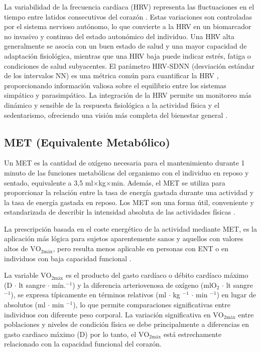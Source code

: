 La variabilidad de la frecuencia cardíaca (HRV) representa las fluctuaciones en el tiempo entre latidos consecutivos del corazón \citep{TaskForce1996,Quigley2024Publication}. Estas variaciones son controladas por el sistema nervioso autónomo, lo que convierte a la HRV en un biomarcador no invasivo y continuo del estado autonómico del individuo. Una HRV alta generalmente se asocia con un buen estado de salud y una mayor capacidad de adaptación fisiológica, mientras que una HRV baja puede indicar estrés, fatiga o condiciones de salud subyacentes. El parámetro HRV-SDNN (desviación estándar de los intervalos NN) es una métrica común para cuantificar la HRV \citep{Damoun2024HRV,Laborde2017}, proporcionando información valiosa sobre el equilibrio entre los sistemas simpático y parasimpático. La integración de la HRV permite un monitoreo más dinámico y sensible de la respuesta fisiológica a la actividad física y el sedentarismo, ofreciendo una visión más completa del bienestar general \citep{Bonneval2025Validity}.

\subsection{MET (Equivalente Metabólico)}
\label{subsec:met}

Un MET es la cantidad de oxígeno necesaria para el mantenimiento durante 1 minuto de las funciones metabólicas del organismo con el individuo en reposo y sentado, equivalente a 3,5 ml$\times$kg$\times$min. Además, el MET se utiliza para proporcionar la relación entre la tasa de energía gastada durante una actividad y la tasa de energía gastada en reposo. Los MET son una forma útil, conveniente y estandarizada de describir la intensidad absoluta de las actividades físicas \citep{Riebe2018ACSM}.

La prescripción basada en el coste energético de la actividad mediante MET, es la aplicación más lógica para sujetos aparentemente sanos y aquellos con valores altos de $\mathrm{VO}_{2\text{máx}}$, pero resulta menos aplicable en personas con ENT o en individuos con baja capacidad funcional \citep{Abellan2014Prescripcion}.

La variable $\mathrm{VO}_{2\text{máx}}$ es el producto del gasto cardíaco o débito cardíaco máximo (D $\cdot$ lt sangre $\cdot$ mín.$^{-1}$) y la diferencia arteriovenosa de oxígeno (mlO$_2$ $\cdot$ lt sangre $^{-1}$), se expresa típicamente en términos relativos (ml $\cdot$ kg $^{-1}$ $\cdot$ min $^{-1}$) en lugar de absolutos (ml $\cdot$ min $^{-1}$), lo que permite comparaciones significativas entre individuos con diferente peso corporal. La variación significativa en $\mathrm{VO}_{2\text{máx}}$ entre poblaciones y niveles de condición física se debe principalmente a diferencias en gasto cardiaco máximo (D) por lo tanto, el $\mathrm{VO}_{2\text{máx}}$ está estrechamente relacionado con la capacidad funcional del corazón.

